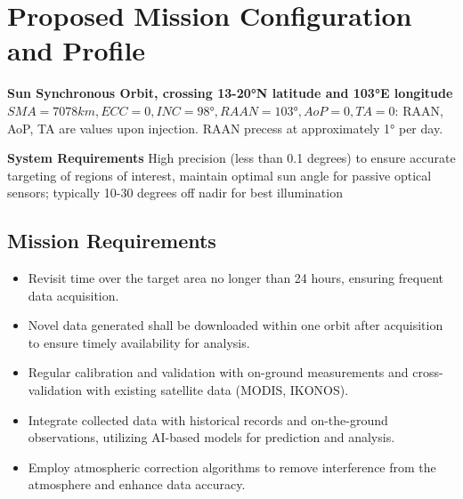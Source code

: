 \section{Proposed Mission Configuration and Profile}
\textbf{Sun Synchronous Orbit, crossing 13-20°N latitude and 103°E longitude} \(SMA=7078 km, ECC=0, INC=98°, RAAN = 103°, AoP = 0, TA =0\): RAAN, AoP, TA are values upon injection. RAAN precess at approximately 1° per day.

\textbf{System Requirements} High precision (less than 0.1 degrees) to ensure accurate targeting of regions of interest, maintain optimal sun angle for passive optical sensors; typically 10-30 degrees off nadir for best illumination

\subsection{Mission Requirements}
\begin{itemize}
    \item Revisit time over the target area no longer than 24 hours, ensuring frequent data acquisition.
    \item Novel data generated shall be downloaded within one orbit after acquisition to ensure timely availability for analysis.
    \item Regular calibration and validation with on-ground measurements and cross-validation with existing satellite data (MODIS, IKONOS).
    \item Integrate collected data with historical records and on-the-ground observations, utilizing AI-based models for prediction and analysis.
    \item Employ atmospheric correction algorithms to remove interference from the atmosphere and enhance data accuracy.
\end{itemize}